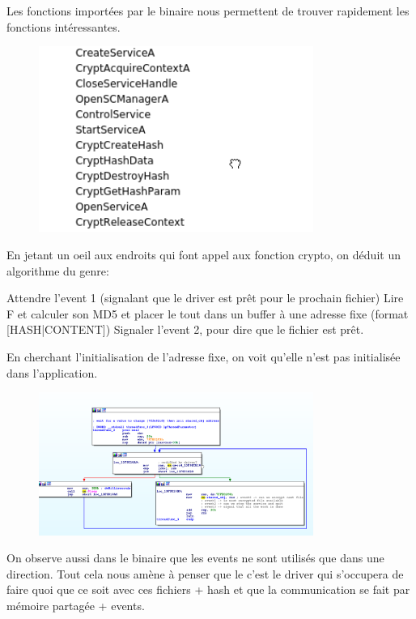 \documentclass[14pt]{article}
\begin{document}
Les fonctions importées par le binaire nous permettent de trouver rapidement les fonctions intéressantes.
\begin{figure}[H]
\includegraphics[width=0.8\textwidth]{./imgs/usb_binary_imports.png}
\centering
\end{figure}

En jetant un oeil aux endroits qui font appel aux fonction crypto, on déduit un algorithme du genre:
\begin{algorithm}[h]
   {
    Attendre l'event 1 (signalant que le driver est prêt pour le prochain fichier)
    Lire F et calculer son MD5 et placer le tout dans un buffer à une adresse fixe (format [HASH|CONTENT])
    Signaler l'event 2, pour dire que le fichier est prêt.
  }
\end{algorithm}

En cherchant l'initialisation de l'adresse fixe, on voit qu'elle n'est pas initialisée dans l'application.
\begin{figure}[H]
\includegraphics[width=0.8\textwidth]{./imgs/usb_binary_wait_driver_init.png}
\centering
\end{figure}

On observe aussi dans le binaire que les events ne sont utilisés que dans une direction.
Tout cela nous amène à penser que le c'est le driver qui s'occupera de faire quoi que ce soit avec ces fichiers + hash et que la communication se fait par mémoire partagée + events.
\end{document}
